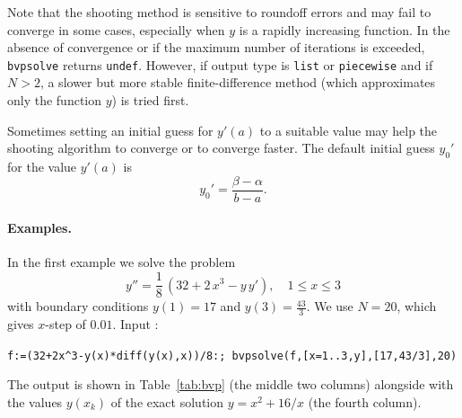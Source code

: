 \documentclass[a4paper,11pt]{book}
\begin{document}
Note that the shooting method is sensitive to roundoff errors and may fail to converge in some cases, especially when $y$ is a rapidly increasing function. In the absence of convergence or if the maximum number of iterations is exceeded, {\tt bvpsolve} returns {\tt undef}. However, if output type is {\tt list} or {\tt piecewise} and if $N>2$, a slower but more stable finite-difference method (which approximates only the function $y$) is tried first.

Sometimes setting an initial guess for $y'(a)$ to a suitable value may help the shooting algorithm to converge or to converge faster. The default initial guess $y_0'$ for the value $y'(a)$ is\[ y_0'=\frac{\beta-\alpha}{b-a}. \]

\paragraph{Examples.}
In the first example we solve the problem \[y''=\frac{1}{8}\,(32+2\,x^3-y\,y'),\quad 1\leq x\leq 3\] with boundary conditions $y(1)=17$ and $y(3)=\frac{43}{3}$. We use $N=20$, which gives $x$-step of $0.01$. Input :
\begin{center}
  \tt f:=(32+2x\verb|^|3-y(x)*diff(y(x),x))/8:; bvpsolve(f,[x=1..3,y],[17,43/3],20)
\end{center}
The output is shown in Table~\ref{tab:bvp} (the middle two columns) alongside with the values $y(x_k)$ of the exact solution $y=x^2+16/x$ (the fourth column).
\end{document}
